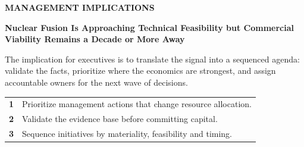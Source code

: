 \documentclass[10pt,a4paper]{article}
\begin{document}
\clearpage
{\textcolor{BOBlue}{\scriptsize\bfseries MANAGEMENT IMPLICATIONS}}\par\vspace{-1pt}
{\Large\sffamily\bfseries\color{BONavy} Nuclear Fusion Is Approaching Technical Feasibility but Commercial Viability Remains a Decade or More Away}\par\vspace{4pt}
{\small The implication for executives is to translate the signal into a sequenced agenda: validate the facts, prioritize where the economics are strongest, and assign accountable owners for the next wave of decisions.}\par
\begin{tabularx}{\linewidth}{p{10mm}Y}
\textcolor{BOBlue}{\bfseries 1} & Prioritize management actions that change resource allocation. \\[5pt]
\textcolor{BOBlue}{\bfseries 2} & Validate the evidence base before committing capital. \\[5pt]
\textcolor{BOBlue}{\bfseries 3} & Sequence initiatives by materiality, feasibility and timing. \\[5pt]
\end{tabularx}
\vspace{6pt}

\vspace{6pt}{\textcolor{BOBlue}{\scriptsize\bfseries EXECUTION ROADMAP}}\par
\begin{center}
\end{center}
\end{document}
